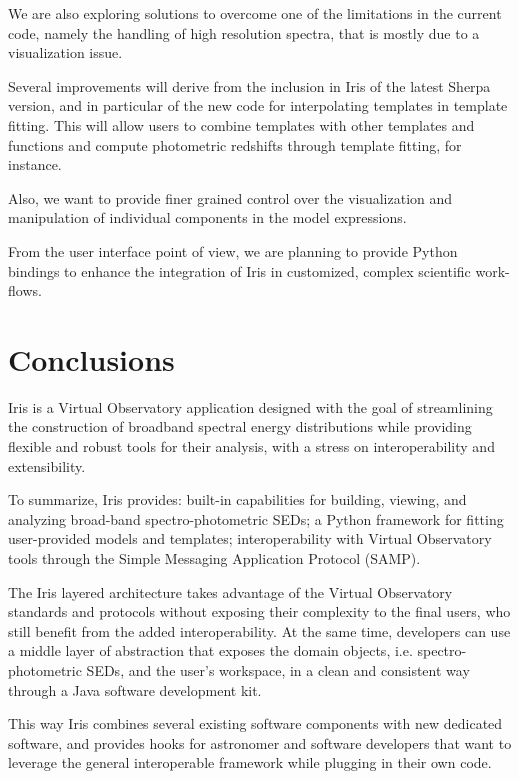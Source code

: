 \documentclass[final,5p,authoryear]{elsarticle}
\begin{document}
We are also exploring solutions to overcome one of the limitations in the
current code, namely the handling of high resolution spectra, that is mostly due
to a visualization issue.

Several improvements will derive from the inclusion in Iris of the latest Sherpa
version, and in particular of the new code for interpolating templates in
template fitting. This will allow users to combine templates with other
templates and functions and compute photometric redshifts through template
fitting, for instance.

Also, we want to provide finer grained control over the visualization and
manipulation of individual components in the model expressions.

From the user interface point of view, we are planning to provide Python
bindings to enhance the integration of Iris in customized, complex scientific
work-flows.

\section{Conclusions} \label{sec:conclusions}

Iris is a Virtual Observatory application designed with the goal of streamlining
the construction of broadband spectral energy distributions while providing
flexible and robust tools for their analysis, with a stress on interoperability
and extensibility.

To summarize, Iris provides: built-in capabilities for building, viewing, and
analyzing broad-band spec\-tro-pho\-to\-met\-ric SEDs; a Python framework for fitting
user-pro\-vid\-ed models and templates; interoperability with Virtual Observatory
tools through the Simple Messaging Application Protocol (SAMP).

The Iris layered architecture takes advantage of the Virtual Observatory
standards and protocols without exposing their complexity to the final users,
who still benefit from the added interoperability. At the same time, developers
can use a middle layer of abstraction that exposes the domain objects, i.e.
spectro-photometric SEDs, and the user's workspace, in a clean and consistent
way through a Java software development kit.

This way Iris combines several existing software components with new dedicated
software, and provides hooks for astronomer and software developers that want to
leverage the general interoperable framework while plugging in their own code.
\end{document}
